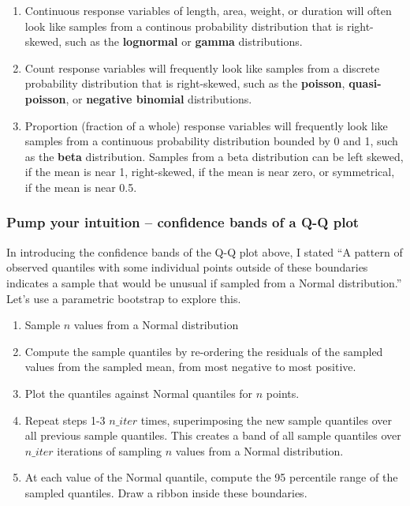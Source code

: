\documentclass[]{book}
\providecommand{\tightlist}{%
  \setlength{\itemsep}{0pt}\setlength{\parskip}{0pt}}
\begin{document}
\begin{enumerate}
\def\labelenumi{\arabic{enumi}.}
\tightlist
\item
  Continuous response variables of length, area, weight, or duration will often look like samples from a continous probability distribution that is right-skewed, such as the \textbf{lognormal} or \textbf{gamma} distributions.
\item
  Count response variables will frequently look like samples from a discrete probability distribution that is right-skewed, such as the \textbf{poisson}, \textbf{quasi-poisson}, or \textbf{negative binomial} distributions.
\item
  Proportion (fraction of a whole) response variables will frequently look like samples from a continuous probability distribution bounded by 0 and 1, such as the \textbf{beta} distribution. Samples from a beta distribution can be left skewed, if the mean is near 1, right-skewed, if the mean is near zero, or symmetrical, if the mean is near 0.5.
\end{enumerate}

\hypertarget{pump-your-intuition-confidence-bands-of-a-q-q-plot}{%
\subsubsection{Pump your intuition -- confidence bands of a Q-Q plot}\label{pump-your-intuition-confidence-bands-of-a-q-q-plot}}

In introducing the confidence bands of the Q-Q plot above, I stated ``A pattern of observed quantiles with some individual points outside of these boundaries indicates a sample that would be unusual if sampled from a Normal distribution.'' Let's use a parametric bootstrap to explore this.

\begin{enumerate}
\def\labelenumi{\arabic{enumi}.}
\tightlist
\item
  Sample \(n\) values from a Normal distribution
\item
  Compute the sample quantiles by re-ordering the residuals of the sampled values from the sampled mean, from most negative to most positive.
\item
  Plot the quantiles against Normal quantiles for \(n\) points.
\item
  Repeat steps 1-3 \(n\_iter\) times, superimposing the new sample quantiles over all previous sample quantiles. This creates a band of all sample quantiles over \(n\_iter\) iterations of sampling \(n\) values from a Normal distribution.
\item
  At each value of the Normal quantile, compute the 95 percentile range of the sampled quantiles. Draw a ribbon inside these boundaries.
\end{enumerate}
\end{document}
